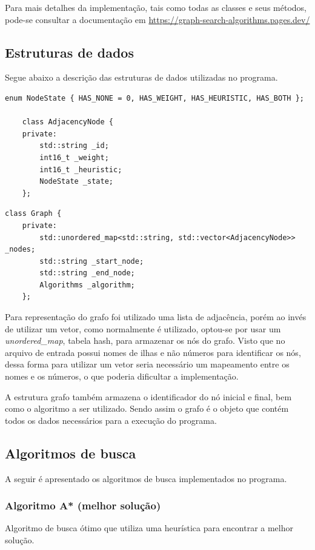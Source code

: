 \documentclass[12pt, a4paper]{article}
\begin{document}
Para mais detalhes da implementação, tais como todas as classes e seus métodos,
pode-se consultar a documentação em \url{https://graph-search-algorithms.pages.dev/}

\subsection{Estruturas de dados}\label{sec:estruturas}
Segue abaixo a descrição das estruturas de dados utilizadas no programa.

\begin{lstlisting}[caption={Estrutura de dados para representar um nó do grafo.}, label={lst:node}]
    enum NodeState { HAS_NONE = 0, HAS_WEIGHT, HAS_HEURISTIC, HAS_BOTH };

    class AdjacencyNode {
    private:
        std::string _id;
        int16_t _weight;
        int16_t _heuristic;
        NodeState _state;
    };
\end{lstlisting}

\begin{lstlisting}[caption={Estrutura de dados para representar o grafo.}, label={lst:graph}]
    class Graph {
    private:
        std::unordered_map<std::string, std::vector<AdjacencyNode>> _nodes;
        std::string _start_node;
        std::string _end_node;
        Algorithms _algorithm;
    };
\end{lstlisting}

Para representação do grafo foi utilizado uma lista de adjacência,
porém ao invés de utilizar um vetor, como normalmente é utilizado,
optou-se por usar um \textit{unordered\_map}, tabela hash, para armazenar os nós do grafo.
Visto que no arquivo de entrada possui nomes de ilhas e não números para identificar os nós,
dessa forma para utilizar um vetor seria necessário um mapeamento entre os nomes e os números,
o que poderia dificultar a implementação.

A estrutura grafo também armazena o identificador do nó inicial e final,
bem como o algoritmo a ser utilizado.
Sendo assim o grafo é o objeto que contém todos os dados necessários para a execução do programa.

\subsection{Algoritmos de busca}\label{sec:algoritmos}
A seguir é apresentado os algoritmos de busca implementados no programa.

\subsubsection{Algoritmo A* (melhor solução)}\label{sec:astar}
Algoritmo de busca ótimo que utiliza uma heurística para encontrar a melhor solução.
\end{document}

